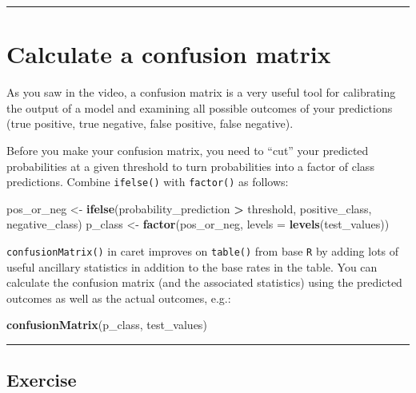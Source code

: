 \documentclass[]{book}
\newenvironment{Shaded}{\begin{snugshade}}{\end{snugshade}}
\newcommand{\KeywordTok}[1]{\textcolor[rgb]{0.13,0.29,0.53}{\textbf{#1}}}
\newcommand{\DataTypeTok}[1]{\textcolor[rgb]{0.13,0.29,0.53}{#1}}
\newcommand{\StringTok}[1]{\textcolor[rgb]{0.31,0.60,0.02}{#1}}
\newcommand{\OperatorTok}[1]{\textcolor[rgb]{0.81,0.36,0.00}{\textbf{#1}}}
\newcommand{\NormalTok}[1]{#1}
\begin{document}
\begin{center}\rule{0.5\linewidth}{\linethickness}\end{center}

\section{Calculate a confusion
matrix}\label{calculate-a-confusion-matrix}

As you saw in the video, a confusion matrix is a very useful tool for
calibrating the output of a model and examining all possible outcomes of
your predictions (true positive, true negative, false positive, false
negative).

Before you make your confusion matrix, you need to ``cut'' your
predicted probabilities at a given threshold to turn probabilities into
a factor of class predictions. Combine \texttt{ifelse()} with
\texttt{factor()} as follows:

\begin{Shaded}
\begin{Highlighting}[]
\NormalTok{pos_or_neg <-}\StringTok{ }\KeywordTok{ifelse}\NormalTok{(probability_prediction }\OperatorTok{>}\StringTok{ }\NormalTok{threshold, positive_class, negative_class)}
\NormalTok{p_class <-}\StringTok{ }\KeywordTok{factor}\NormalTok{(pos_or_neg, }\DataTypeTok{levels =} \KeywordTok{levels}\NormalTok{(test_values))}
\end{Highlighting}
\end{Shaded}

\texttt{confusionMatrix()} in caret improves on \texttt{table()} from
base \texttt{R} by adding lots of useful ancillary statistics in
addition to the base rates in the table. You can calculate the confusion
matrix (and the associated statistics) using the predicted outcomes as
well as the actual outcomes, e.g.:

\begin{Shaded}
\begin{Highlighting}[]
\KeywordTok{confusionMatrix}\NormalTok{(p_class, test_values)}
\end{Highlighting}
\end{Shaded}

\begin{center}\rule{0.5\linewidth}{\linethickness}\end{center}

\subsection*{Exercise}\label{exercise-11}
\end{document}
